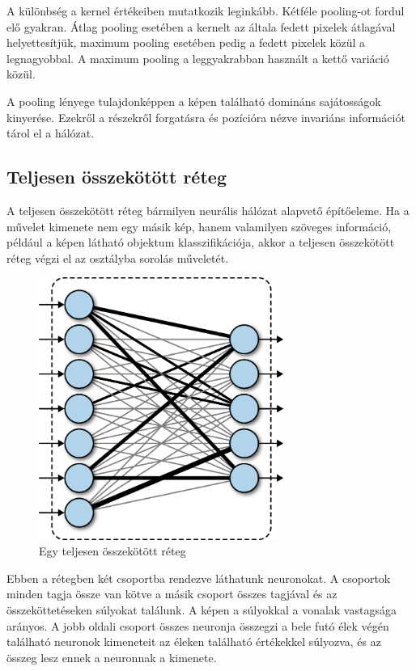 A különbség a kernel értékeiben mutatkozik leginkább. Kétféle pooling-ot fordul elő gyakran. Átlag pooling esetében a kernelt az általa fedett pixelek átlagával helyettesítjük, maximum pooling esetében pedig a fedett pixelek közül a legnagyobbal. A maximum pooling a leggyakrabban használt a kettő variáció közül.

A pooling lényege tulajdonképpen a képen található domináns sajátosságok kinyerése. Ezekről a részekről forgatásra és pozícióra nézve invariáns információt tárol el a hálózat.\cite{ConvNetExplain}

\subsection{Teljesen összekötött réteg}
A teljesen összekötött réteg bármilyen neurális hálózat alapvető építőeleme. Ha a művelet kimenete nem egy másik kép, hanem valamilyen szöveges információ, például a képen látható objektum klasszifikációja, akkor a teljesen összekötött réteg végzi el az osztályba sorolás műveletét.

\begin{figure}[!ht]
    \centering
    \includegraphics[width=80mm, keepaspectratio]{figures/fcl.png}
    \caption{Egy teljesen összekötött réteg \cite{ConvPic} }
\end{figure}

Ebben a rétegben két csoportba rendezve láthatunk neuronokat. A csoportok minden tagja össze van kötve a másik csoport összes tagjával és az összeköttetéseken súlyokat találunk. A képen a súlyokkal a vonalak vastagsága arányos. A jobb oldali csoport összes neuronja összegzi a bele futó élek végén található neuronok kimeneteit az éleken található értékekkel súlyozva, és az összeg lesz ennek a neuronnak a kimenete.


